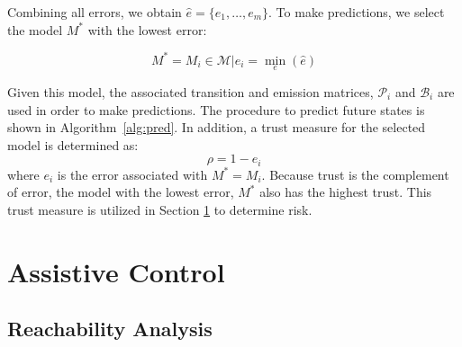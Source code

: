 \documentclass[letterpaper, 10 pt, conference]{ieeeconf}  %
\begin{document}
Combining all errors, we obtain $\hat{e} = \{e_1,\ldots,e_m\}$. To make predictions, we select the model $M^*$ with the lowest error:

\begin{equation}
    M^*=M_i\in\mathcal{M}\vert e_i = \min_e(\hat{e})
\end{equation}

  Given this model, the associated transition and emission matrices, $\mathcal{P}_{i}$ and $\mathcal{B}_{i}$ are used in order to make predictions. The procedure to predict future states is shown in Algorithm~\ref{alg:pred}. In addition, a trust measure for the selected model is determined as:
  \begin{equation}
    \rho = 1-e_i
 \end{equation}
 where $e_i$ is the error associated with $M^* = M_i$. Because trust is the complement of error, the model with the lowest error, $M^*$ also has the highest trust. This trust measure is utilized in Section \ref{sec:adapt} to determine risk.

\section{Assistive Control} \label{sec:adapt}

\subsection{Reachability Analysis}
\end{document}
